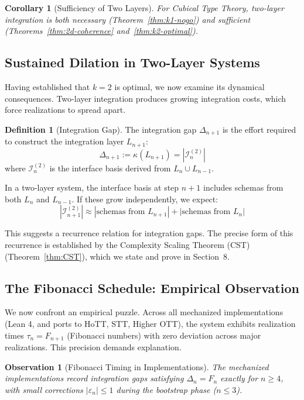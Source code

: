 \documentclass[11pt]{article}
\newtheorem{corollary}[theorem]{Corollary}
\newtheorem{observation}[theorem]{Observation}
\theoremstyle{definition}
\newtheorem{definition}[theorem]{Definition}
\theoremstyle{remark}
\begin{document}
\begin{corollary}[Sufficiency of Two Layers]
\label{cor:k2-sufficient}
For Cubical Type Theory, two-layer integration is both necessary (Theorem~\ref{thm:k1-nogo})
and sufficient (Theorems~\ref{thm:2d-coherence} and~\ref{thm:k2-optimal}).
\end{corollary}

\subsection{Sustained Dilation in Two-Layer Systems}

Having established that $k = 2$ is optimal, we now examine its dynamical consequences. Two-layer
integration produces growing integration costs, which force realizations to spread apart.

\begin{definition}[Integration Gap]
The integration gap $\Delta_{n+1}$ is the effort required to construct the integration layer $L_{n+1}$:
\[
\Delta_{n+1} := \kappa(L_{n+1}) = |\mathcal{I}_n^{(2)}|
\]
where $\mathcal{I}_n^{(2)}$ is the interface basis derived from $L_n \cup L_{n-1}$.
\end{definition}

In a two-layer system, the interface basis at step $n+ 1$ includes schemas from both $L_n$ and $L_{n-1}$.
If these grow independently, we expect:
\[
|\mathcal{I}_{n+1}^{(2)}| \approx |\text{schemas from } L_{n+1}| + |\text{schemas from } L_n|
\]

This suggests a recurrence relation for integration gaps. The precise form of this recurrence is
established by the Complexity Scaling Theorem (CST) (Theorem~\ref{thm:CST}), which we state and prove
in Section~8.

\subsection{The Fibonacci Schedule: Empirical Observation}

We now confront an empirical puzzle. Across all mechanized implementations (Lean 4, and ports to
HoTT, STT, Higher OTT), the system exhibits realization times $\tau_n = F_{n+1}$ (Fibonacci numbers)
with zero deviation across major realizations. This precision demands explanation.

\begin{observation}[Fibonacci Timing in Implementations]
\label{obs:fibonacci}
The mechanized implementations record integration gaps satisfying $\Delta_n = F_n$ exactly for $n \geq 4$,
with small corrections $|\varepsilon_n| \leq 1$ during the bootstrap phase ($n \leq 3$).
\end{observation}
\end{document}
